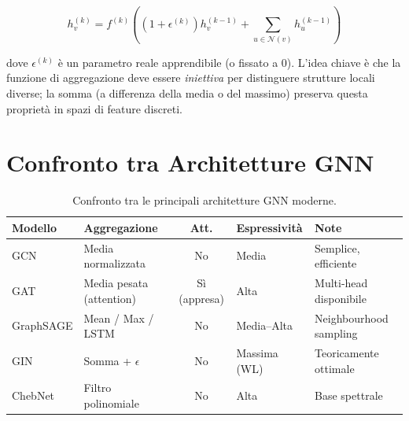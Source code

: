 \begin{equation}
  h_v^{(k)} = f^{(k)}\!\left(
    \left(1 + \epsilon^{(k)}\right) h_v^{(k-1)}
    + \sum_{u \in \mathcal{N}(v)} h_u^{(k-1)}
  \right)
  \label{eq:gin}
\end{equation}

dove $\epsilon^{(k)}$ è un parametro reale apprendibile (o fissato
a 0). L'idea chiave è che la funzione di aggregazione deve essere
\emph{iniettiva} per distinguere strutture locali diverse; la somma
(a differenza della media o del massimo) preserva questa proprietà
in spazi di feature discreti.

\section{Confronto tra Architetture GNN}
\label{sec:gnn-comparison}

\begin{table}[H]
  \centering
  \caption{Confronto tra le principali architetture GNN moderne.}
  \label{tab:gnn-comparison}
  \small
  \begin{tabularx}{\linewidth}{l X c l X}
    \toprule
    \textbf{Modello} & \textbf{Aggregazione}
      & \textbf{Att.} & \textbf{Espressività} & \textbf{Note} \\
    \midrule
    GCN       & Media normalizzata       & No           & Media       & Semplice, efficiente \\
    GAT       & Media pesata (attention) & Sì (appresa) & Alta        & Multi-head disponibile \\
    GraphSAGE & Mean / Max / LSTM        & No           & Media--Alta & Neighbourhood sampling \\
    GIN       & Somma + $\epsilon$       & No           & Massima (WL)& Teoricamente ottimale \\
    ChebNet   & Filtro polinomiale       & No           & Alta        & Base spettrale \\
    \bottomrule
  \end{tabularx}
\end{table}

